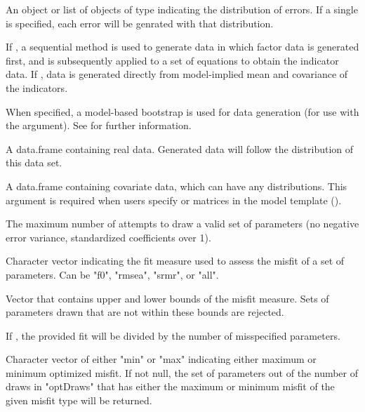 \documentclass[a4paper]{book}
\begin{document}
\begin{Arguments}
\begin{ldescription}
\item[\code{errorDist}]  
An object or list of objects of type  indicating the distribution of errors. If a single  is specified, each error will be genrated with that distribution.

\item[\code{sequential}]  
If , a sequential method is used to generate data in which factor data is generated first, and is subsequently applied to a set of equations to obtain the indicator data. If , data is generated directly from model-implied mean and covariance of the indicators.

\item[\code{modelBoot}]  
When specified, a model-based bootstrap is used for data generation (for use with the  argument). See  for further information.

\item[\code{realData}]  
A data.frame containing real data. Generated data will follow the distribution of this data set.

\item[\code{covData}]  
A data.frame containing covariate data, which can have any distributions. This argument is required when users specify  or  matrices in the model template ().

\item[\code{maxDraw}]  
The maximum number of attempts to draw a valid set of parameters (no negative error variance, standardized coefficients over 1).

\item[\code{misfitType}]  
Character vector indicating the fit measure used to assess the misfit of a set of parameters. Can be "f0", "rmsea", "srmr", or "all". 

\item[\code{misfitBounds}]  
Vector that contains upper and lower bounds of the misfit measure. Sets of parameters drawn that are not within these bounds are rejected.

\item[\code{averageNumMisspec}]  
If , the provided fit will be divided by the number of misspecified parameters. 

\item[\code{optMisfit}]  
Character vector of either "min" or "max" indicating either maximum or minimum optimized misfit. If not null, the set of parameters out of the number of draws in "optDraws" that has either the maximum or minimum misfit of the given misfit type will be returned.


\end{ldescription}
\end{Arguments}
\end{document}

